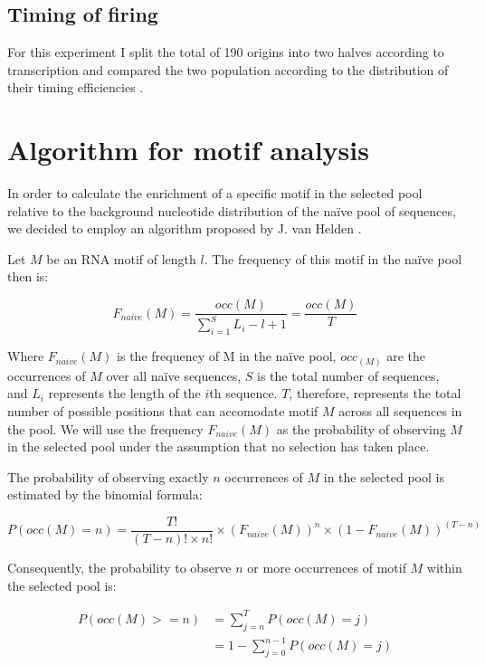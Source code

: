 \subsection*{Timing of firing}

For this experiment I split the total of 190 origins into two halves according to transcription and compared the two population according to the distribution of their timing efficiencies .

\section*{Algorithm for motif analysis}

In order to calculate the enrichment of a specific motif in the selected pool relative to the background nucleotide distribution of the na\"{i}ve pool of sequences, we decided to employ an algorithm proposed by J. van Helden \cite{vanhelden:1998:extracting}. 
 
Let $M$ be an RNA motif of length $l$. The frequency of this motif in the na\"{i}ve pool then is:

\begin{equation} \label{feaf}
F_{naive}(M)  =\dfrac{occ(M)}{\sum_{i=1}^{S} L_i - l + 1} = \dfrac{occ(M)}{T}
\end{equation}

Where $F_{naive}(M)$ is the frequency of M in the na\"{i}ve pool, $occ_(M)$ are the occurrences of $M$ over all na\"{i}ve sequences, $S$ is the total number of  sequences, and $L_i$ represents the length of the $i$th sequence. $T$, therefore, represents the total number of possible positions that can accomodate motif $M$ across all sequences in the pool. We will use the frequency $F_{naive}(M)$ as the probability of observing $M$ in the selected pool under the assumption that no selection has taken place.


The probability of observing exactly $n$ occurrences of $M$ in the selected pool is estimated by the binomial formula:

\begin{equation}
P(occ(M)=n) = \dfrac{T!}{(T-n)! \times n!} \times (F_{naive}(M))^n \times (1-F_{naive}(M))^{(T-n)}
\end{equation}

Consequently, the probability to observe $n$ or more occurrences of motif $M$ within the selected pool is:

\begin{equation} \label{pval}
\begin{split}
P(occ(M) >= n) & = \sum_{j=n}^{T}P(occ(M) = j)\\
& = 1-\sum_{j=0}^{n-1}P(occ(M) = j)
\end{split}
\end{equation}

